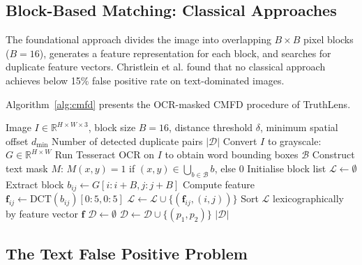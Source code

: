 \documentclass[12pt,a4paper,oneside]{report}
\begin{document}
\subsection{Block-Based Matching: Classical Approaches}

The foundational approach \cite{fridrich2003} divides the image into overlapping
$B\times B$ pixel blocks ($B=16$), generates a feature representation for each
block, and searches for duplicate feature vectors. Christlein et al.
\cite{christlein2012} found that no classical approach achieves below 15\%
false positive rate on text-dominated images.

Algorithm~\ref{alg:cmfd} presents the OCR-masked CMFD procedure of TruthLens.

\begin{algorithm}[H]
\caption{OCR-Masked Block-Based Copy-Move Forgery Detection (TruthLens)}
\label{alg:cmfd}
\begin{algorithmic}[1]
\Require Image $I \in \mathbb{R}^{H \times W \times 3}$, block size $B=16$,
         distance threshold $\delta$, minimum spatial offset $d_{\min}$
\Ensure Number of detected duplicate pairs $|\mathcal{D}|$
\State Convert $I$ to grayscale: $G \in \mathbb{R}^{H \times W}$
\State Run Tesseract OCR on $I$ to obtain word bounding boxes $\mathcal{B}$
\State Construct text mask $M$: $M(x,y) = 1$ if $(x,y) \in \bigcup_{b \in \mathcal{B}} b$, else $0$
\State Initialise block list $\mathcal{L} \gets \emptyset$
      \State Extract block $b_{ij} \gets G[i:i+B, j:j+B]$
      \State Compute feature $\mathbf{f}_{ij} \gets \text{DCT}(b_{ij})[0:5, 0:5]$
      \State $\mathcal{L} \gets \mathcal{L} \cup \{(\mathbf{f}_{ij}, (i,j))\}$
    \EndIf
  \EndFor
\EndFor
\State Sort $\mathcal{L}$ lexicographically by feature vector $\mathbf{f}$
\State $\mathcal{D} \gets \emptyset$
    \State $\mathcal{D} \gets \mathcal{D} \cup \{(p_1, p_2)\}$
  \EndIf
\EndFor
\State \Return $|\mathcal{D}|$
\end{algorithmic}
\end{algorithm}

\subsection{The Text False Positive Problem}
\end{document}
